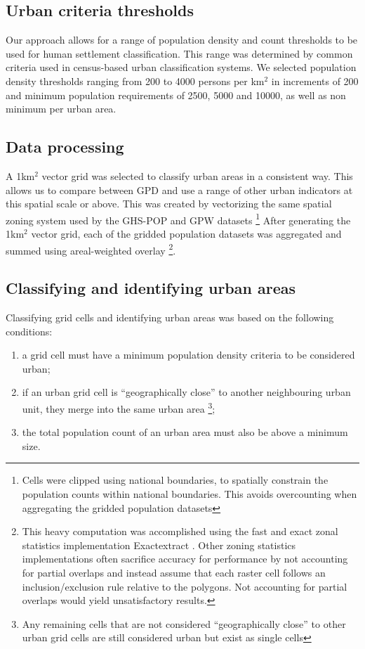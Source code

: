 \documentclass[review]{elsarticle}
\begin{document}
	
	\subsection{Urban criteria thresholds}
	Our approach allows for a range of population density and count thresholds to be used for human settlement classification.
	This range was determined by common criteria used in census-based urban classification systems.
	We selected population density thresholds ranging from 200 to 4000 persons per km$^2$ in increments of 200 and minimum population requirements of 2500, 5000 and 10000, as well as non minimum per urban area.
	
	
	\subsection{Data processing}
	A 1km$^2$ vector grid was selected to classify urban areas in a consistent way.
	This allows us to compare between GPD and use a range of other urban indicators at this spatial scale or above.
	This was created by vectorizing the same spatial zoning system used by the GHS-POP and GPW datasets \footnote{Cells were clipped using national boundaries, to spatially constrain the population counts within national boundaries. This avoids overcounting when aggregating the gridded population datasets}
	After generating the 1km$^2$ vector grid, each of the gridded population datasets was aggregated and summed using areal-weighted overlay \footnote{This heavy computation was accomplished using the fast and exact zonal statistics implementation Exactextract \cite{Exactextract2020}.
		Other zoning statistics implementations often sacrifice accuracy for performance by not accounting for partial overlaps and instead assume that each raster cell follows an inclusion/exclusion rule relative to the polygons.
		Not accounting for partial overlaps would yield unsatisfactory results.}.
	
	
	\subsection{Classifying and identifying urban areas}
	Classifying grid cells and identifying urban areas was based on the following conditions:
	
	\begin{enumerate}
		\item a grid cell must have a minimum population density criteria to be considered urban; 
		\item if an urban grid cell is ``geographically close'' to another neighbouring urban unit, they merge into the same urban area \footnote{Any remaining cells that are not considered ``geographically close'' to other urban grid cells are still considered urban but exist as single cells};
		\item the total population count of an urban area must also be above a minimum size.
	\end{enumerate}
	
\end{document}
